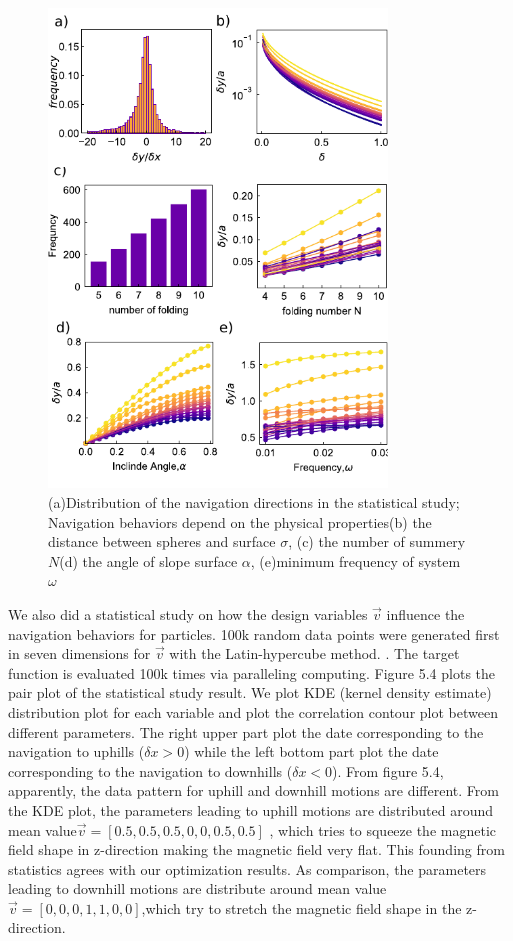 \begin{figure}[p]
\centering
\includegraphics[width=9cm]{figures/5_5.pdf}
\caption{(a)Distribution of the navigation directions in the statistical study; Navigation behaviors depend on the physical properties(b) the distance between spheres and surface $\sigma$, (c) the number of summery $N$(d) the angle of slope surface $\alpha$, (e)minimum frequency of system  $\omega$ }
\label{fig:1}
\end{figure}


We also did a statistical study on how the design variables $\vec{v}$ influence the  navigation behaviors for particles. 100k random data points were generated first in seven dimensions for $\vec{v}$ with the Latin-hypercube method.\autocite{park1994optimal} . The target function is evaluated 100k times via paralleling computing. Figure 5.4 plots the pair plot of the statistical study result. We plot KDE (kernel density estimate) distribution plot for each variable and plot the correlation contour plot between different parameters. The right upper part plot the date corresponding to the navigation to uphills ($\delta x>0$) while the left bottom part plot the date corresponding to the navigation to downhills ($\delta x<0$). From figure 5.4, apparently, the data pattern for uphill and downhill motions are different. From the KDE plot, the parameters leading to uphill motions are distributed around mean value$\vec{v}=[0.5,0.5,0.5,0,0,0.5,0.5]$  , which tries to squeeze the magnetic field shape in z-direction making the magnetic field  very flat. This founding from statistics agrees with our optimization results. As comparison, the parameters leading to downhill motions are distribute around mean value$\vec{v}=[0,0,0,1,1,0,0]$,which try to 
stretch the magnetic field shape in the z-direction.
 
